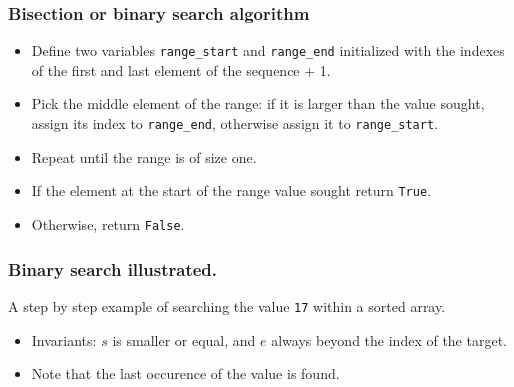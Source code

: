 \documentclass{beamer} %
\begin{document}
\begin{frame}
\frametitle{Bisection or binary search algorithm} 

\begin{itemize}
\item Define two variables \texttt{range\_start} and \texttt{range\_end} initialized with the indexes of the first and last element of the sequence + 1. 
\item Pick the middle element of the range: if it is larger than the value sought, assign its index to \texttt{range\_end}, otherwise assign it to \texttt{range\_start}. 
\item Repeat until the range is of size one.
\item If the element at the start of the range value sought return \texttt{True}. 
\item Otherwise, return \texttt{False}.
\end{itemize}

\end{frame}


\begin{frame}
\frametitle{Binary search illustrated.}

A step by step example of searching the value \texttt{17} within a sorted array.

\begin{center}

\end{center}

\vspace{5mm}
\begin{itemize}
	\item Invariants: $s$ is smaller or equal, and $e$ always beyond the index of the target.
\item Note that the last occurence of the value is found.
\end{itemize}

\end{frame}

\end{document}
